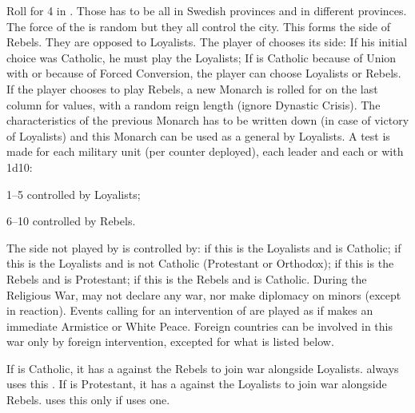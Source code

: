 \phevnt
\aparag Roll for 4 \REVOLT in \SUE. Those \REVOLT has to be all in Swedish
provinces and in different provinces. The force of the \REVOLT is random but
they all control the city.  This forms the side of Rebels. They are opposed to
Loyalists.
\aparag The player of \SUE chooses its side:
\bparag If his initial choice was Catholic, he must play the Loyalists;
\bparag If \SUE is Catholic because of Union with \POL or because of Forced
Conversion, the player can choose Loyalists or Rebels.
\bparag If the player chooses to play Rebels, a new Monarch is rolled for on
the last column for values, with a random reign length (ignore Dynastic
Crisis). The characteristics of the previous Monarch has to be written down
(in case of victory of Loyalists) and this Monarch can be used as a general by
Loyalists.
\aparag A test is made for each military unit (per counter deployed), each
leader and each \COL or \TP with 1d10:
\begin{modlist}
\item[1--5] controlled by Loyalists;
\item[6--10] controlled by Rebels.
\end{modlist}
\aparag The side not played by \SUE is controlled by:
\bparag \POL if this is the Loyalists and \POL is Catholic;
\bparag \HAB if this is the Loyalists and \POL is not Catholic (Protestant or
Orthodox);
\bparag \ENG if this is the Rebels and \ENG is Protestant;
\bparag \MAJHOL if this is the Rebels and \ENG is Catholic.
\aparag During the Religious War, \SUE may not declare any war, nor make
diplomacy on minors (except in reaction). Events calling for an intervention
of \SUE are played as if \SUE makes an immediate Armistice or White Peace.
\aparag Foreign countries can be involved in this war only by foreign
intervention, excepted for what is listed below.

\phdipl
\aparag If \POLpol is Catholic, it has a \CB against the Rebels to join war
alongside Loyalists. \POLmin always uses this \CB.
\aparag If \DANdan is Protestant, it has a \CB against the Loyalists to join
war alongside Rebels. \DANMin uses this \CB only if \POL uses one.


